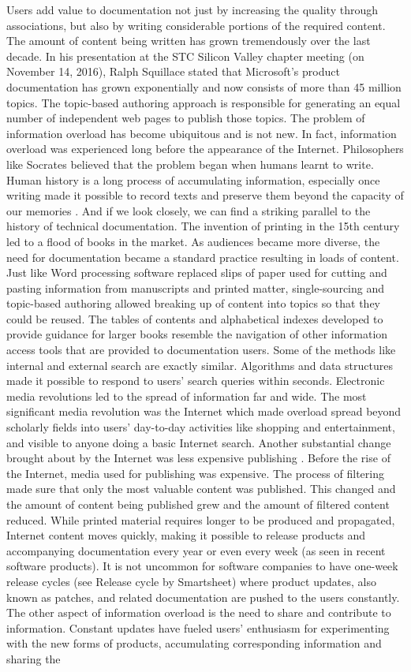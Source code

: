 Users add value to documentation not just by increasing the quality through associations, but also by writing considerable portions of the required content. The amount of content being written has grown tremendously over the last decade. In his presentation at the STC Silicon Valley chapter meeting (on November 14, 2016), Ralph Squillace stated that Microsoft’s product documentation has grown exponentially and now consists of more than 45 million topics. The topic-based authoring approach is responsible for generating an equal number of independent web pages to publish those topics. The problem of information overload has become ubiquitous and is not new. In fact, information overload was experienced long before the appearance of the Internet. Philosophers like Socrates believed that the problem began when humans learnt to write. Human history is a long process of accumulating information, especially once writing made it possible to record texts and preserve them beyond the capacity of our memories \cite{blair2010too}. And if we look closely, we can find a striking parallel to the history of technical documentation. The invention of printing in the 15th century led to a flood of books in the market. As audiences became more diverse, the need for documentation became a standard practice resulting in loads of content. Just like Word processing software replaced slips of paper used for cutting and pasting information from manuscripts and printed matter, single-sourcing and topic-based authoring allowed breaking up of content into topics so that they could be reused. The tables of contents and alphabetical indexes developed to provide guidance for larger books resemble the navigation of other information access tools that are provided to documentation users. Some of the methods like internal and external search are exactly similar. Algorithms and data structures made it possible to respond to users' search queries within seconds. Electronic media revolutions led to the spread of information far and wide. The most significant media revolution was the Internet which made overload spread beyond scholarly fields into users' day-to-day activities like shopping and entertainment, and visible to anyone doing a basic Internet search. Another substantial change brought about by the Internet was less expensive publishing \cite{blair2010too}. Before the rise of the Internet, media used for publishing was expensive. The process of filtering made sure that only the most valuable content was published. This changed and the amount of content being published grew and the amount of filtered content reduced. While printed material requires longer to be produced and propagated, Internet content moves quickly, making it possible to release products and accompanying documentation every year or even every week (as seen in recent software products). It is not uncommon for software companies to have one-week release cycles (see Release cycle by Smartsheet) where product updates, also known as patches, and related documentation are pushed to the users constantly. The other aspect of information overload is the need to share and contribute to information. Constant updates have fueled users' enthusiasm for experimenting with the new forms of products, accumulating corresponding information and sharing the 